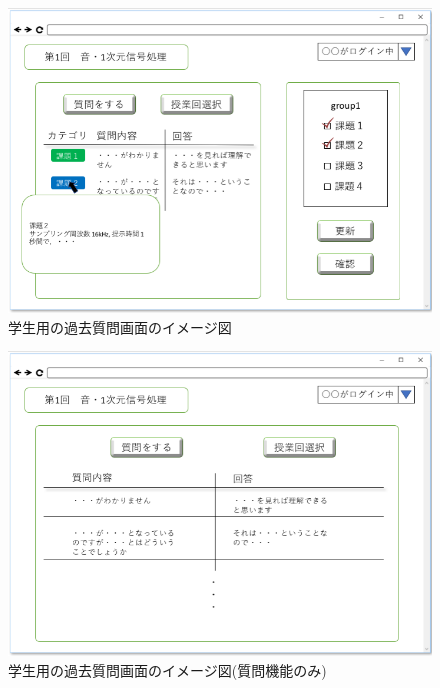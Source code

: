 \begin{figure}[phtbp]
  \begin{center}
    \includegraphics[width=1\linewidth,clip]{./img/34.png}
    \caption{学生用の過去質問画面のイメージ図}\label{fig:34}
  \end{center}
\end{figure}

\begin{figure}[phtbp]
  \begin{center}
    \includegraphics[width=1\linewidth,clip]{./img/35.png}
    \caption{学生用の過去質問画面のイメージ図(質問機能のみ)}\label{fig:35}
  \end{center}
\end{figure}

\newpage



